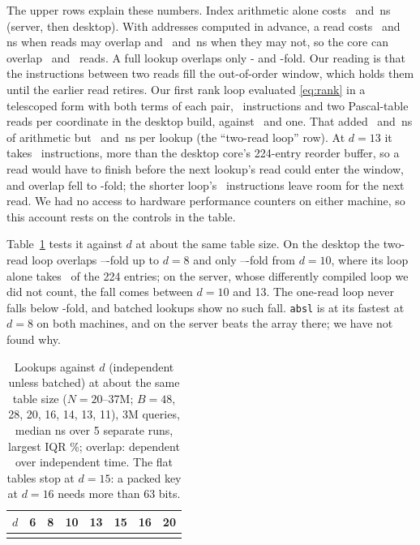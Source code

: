 \documentclass[preprint,12pt]{elsarticle}
\begin{document}
The upper rows explain these numbers. Index arithmetic alone costs \qSRank\ and
\qDRank\,ns (server, then desktop). With addresses computed in advance, a read costs \qSPre\ and \qDPre\,ns when reads may overlap and \qSPreDep\ and \qDPreDep\,ns when they may not, so the core can overlap \hMlpPreS\ and \hMlpPreD\ reads. A full lookup
overlaps only \hMlpOneS- and \hMlpOneD-fold. Our reading is that the instructions between two
reads fill the out-of-order window, which holds them until the earlier read
retires.\cite{chou2004} Our first rank loop evaluated
\eqref{eq:rank} in a telescoped form with both terms of each pair, \hLoopTwoD\
instructions and two Pascal-table reads per coordinate in the desktop build, against \hLoopOneD\ and one. That added
\hRankAddS\ and \hRankAddD\,ns of arithmetic but \hLookAddS\ and \hLookAddD\,ns per
lookup (the ``two-read loop'' row). At $d=13$ it takes \hLookupTwoD\ instructions, more than the desktop core's 224-entry reorder buffer, so a read would have to finish before the next lookup's read could enter the window, and overlap fell to \hMlpTwoD-fold; the shorter loop's \hLookupOneD\ instructions leave room for the next read. We had no access to hardware performance counters on either machine, so this account rests on the controls in the table.

Table~\ref{tab:window} tests it against $d$ at about the same
table size. On the desktop the two-read loop overlaps \hWinTwoEarlyLoD--\hWinTwoEarlyHiD-fold
up to $d=8$ and only \hWinTwoLateLoD--\hWinTwoLateHiD-fold from $d=10$, where its loop alone takes \hLoopTwoTenD\ of the 224 entries; on the server, whose differently compiled loop we did not count, the fall comes between $d=10$ and 13. The one-read loop never falls
below \hWinOneMinS-fold, and batched lookups show no such fall. \texttt{absl} is at its fastest at $d=8$ on both machines, and on the server beats the array there; we have not found why.

\begin{table}[htbp]
\caption{Lookups against $d$ (independent unless batched) at about the same table size ($N=20$--37M; $B=48$, 28, 20, 16, 14, 13, 11),
3M queries, median ns over 5 separate runs, largest IQR \hSpreadWin\%; overlap: dependent over independent time. The flat tables stop
at $d=15$: a packed key at $d=16$ needs more than 63 bits.}
\label{tab:window}
\centering\footnotesize
\begin{tabular}{lccccccc}
\toprule
$d$ & 6 & 8 & 10 & 13 & 15 & 16 & 20 \\
\midrule
\tabin{tables/window.tex}
\bottomrule
\end{tabular}
\end{table}
\end{document}
